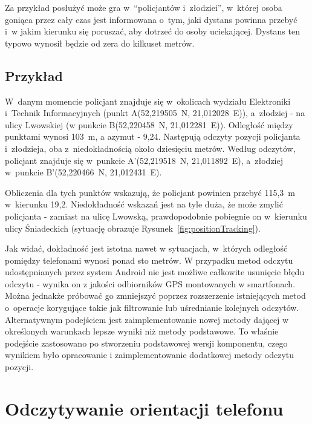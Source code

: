 \documentclass[a4paper,twocolumn,11pt]{article}
\begin{document}
 Za przykład posłużyć może gra w~``policjantów i~złodziei'', w~której osoba goniąca przez cały czas jest informowana o~tym, jaki dystans powinna przebyć i~w jakim kierunku się poruszać, aby dotrzeć do osoby uciekającej.
 Dystans ten typowo wynosił będzie od zera do kilkuset metrów.
 
 \subsection{Przykład}
 W~danym momencie policjant znajduje się w~okolicach wydziału Elektroniki i~Technik Informacyjnych (punkt A(52,219505\textdegree~N, 21,012028\textdegree~E)), a~złodziej - na ulicy Lwowskiej (w punkcie B(52,220458\textdegree~N, 21,012281\textdegree~E)).
 Odległość między punktami wynosi 103~m, a azymut - 9,24\textdegree.
 Następują odczyty pozycji policjanta i~złodzieja, oba z~niedokładnością około dziesięciu metrów.
 Według odczytów, policjant znajduje się w~punkcie A'(52,219518\textdegree~N, 21,011892\textdegree~E), a~złodziej w~punkcie B'(52,220466\textdegree~N, 21,012431\textdegree~E).
 
 Obliczenia dla tych punktów wskazują, że policjant powinien przebyć 115,3~m w~kierunku 19,2\textdegree.
 Niedokładność wskazań jest na tyle duża, że może zmylić policjanta - zamiast na ulicę Lwowską, prawdopodobnie pobiegnie on w~kierunku ulicy Śniadeckich (sytuację obrazuje Rysunek~\ref{fig:positionTracking}).

%
 
 Jak widać, dokładność jest istotna nawet w sytuacjach, w~których odległość pomiędzy telefonami wynosi ponad sto metrów.
 W przypadku metod odczytu udostępnianych przez system Android nie jest możliwe całkowite usunięcie błędu odczytu - wynika on z jakości odbiorników GPS montowanych w smartfonach.
 Można jednakże próbować go zmniejszyć poprzez rozszerzenie istniejących metod o~operacje korygujące takie jak filtrowanie lub uśrednianie kolejnych odczytów.
 Alternatywnym podejściem jest zaimplementowanie nowej metody dającej w określonych warunkach lepsze wyniki niż metody podstawowe.
 To właśnie podejście zastosowano po stworzeniu podstawowej wersji komponentu, czego wynikiem było opracowanie i zaimplementowanie dodatkowej metody odczytu pozycji.




\section{Odczytywanie orientacji telefonu}
\end{document}
